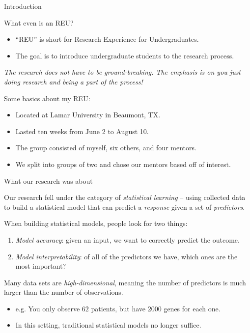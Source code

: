 \documentclass[8pt]{beamer}
\newcommand{\mys}{\vspace{0.5cm} \pause
}
\begin{document}
\begin{frame}{Introduction}

What even is an REU?
\begin{itemize}
    \item ``REU'' is short for Research Experience for Undergraduates.
    \item The goal is to introduce undergraduate students to the research process.
\end{itemize} \mys

\textit{The research does not have to be ground-breaking. The emphasis is on you just doing research and being a part of the process!} \mys

Some basics about my REU:
\begin{itemize}
    \item Located at Lamar University in Beaumont, TX.
    \item Lasted ten weeks from June 2 to August 10. 
    \item The group consisted of myself, six others, and four mentors.
    \item We split into groups of two and chose our mentors based off of interest.
\end{itemize}
    
\end{frame}

\begin{frame}{What our research was about}

Our research fell under the category of \textit{statistical learning} -- using collected data to build a statistical model that can predict a \textit{response} given a set of \textit{predictors}. \mys

When building statistical models, people look for two things:
\begin{enumerate}
    \item \textit{Model accuracy}: given an input, we want to correctly predict the outcome.
    \item \textit{Model interpretability}: of all of the predictors we have, which ones are the most important?
\end{enumerate} \mys

Many data sets are \textit{high-dimensional}, meaning the number of predictors is much larger than the number of observations.
\begin{itemize}
    \item e.g. You only observe $62$ patients, but have $2000$ genes for each one.
    \item In this setting, traditional statistical models no longer suffice.
\end{itemize} 

\end{frame}
\end{document}
